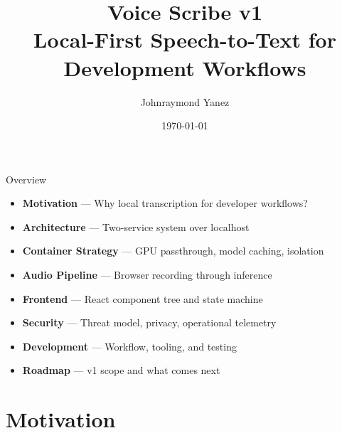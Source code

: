 \documentclass{beamer}
\title[Voice Scribe v1]{Voice Scribe v1\\Local-First Speech-to-Text for Development Workflows}
\author[J. Yanez]{Johnraymond Yanez}
\institute[Voice Scribe]{Voice Scribe}
\date{\today}
\begin{document}
\begin{frame}
\small{\titlepage}
\end{frame}


\begin{frame}{Overview}
    \begin{itemize}
        \item \textbf{Motivation} --- Why local transcription for developer workflows?
        \item \textbf{Architecture} --- Two-service system over localhost
        \item \textbf{Container Strategy} --- GPU passthrough, model caching, isolation
        \item \textbf{Audio Pipeline} --- Browser recording through inference
        \item \textbf{Frontend} --- React component tree and state machine
        \item \textbf{Security} --- Threat model, privacy, operational telemetry
        \item \textbf{Development} --- Workflow, tooling, and testing
        \item \textbf{Roadmap} --- v1 scope and what comes next
    \end{itemize}
\end{frame}


\section{Motivation}
\end{document}
